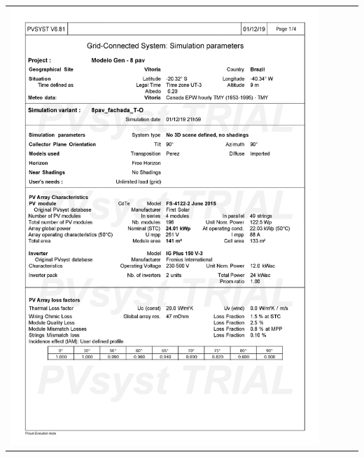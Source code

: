 \begin{table}[H]
    \centering
    \begin{tabular}{l}
        \includegraphics[width=0.9\textwidth]{figures/attachments/resultpv13.jpg}
    \end{tabular}
\end{table}
\pagebreak
